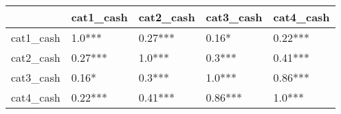\begin{tabular}{lllll}
\toprule
{} & cat1\_cash & cat2\_cash & cat3\_cash & cat4\_cash \\
\midrule
cat1\_cash &    1.0*** &   0.27*** &     0.16* &   0.22*** \\
cat2\_cash &   0.27*** &    1.0*** &    0.3*** &   0.41*** \\
cat3\_cash &     0.16* &    0.3*** &    1.0*** &   0.86*** \\
cat4\_cash &   0.22*** &   0.41*** &   0.86*** &    1.0*** \\
\bottomrule
\end{tabular}
